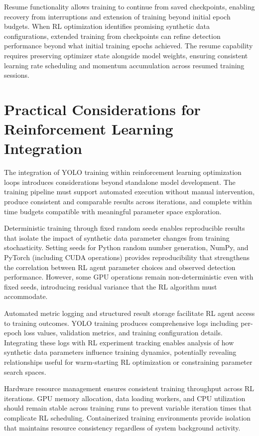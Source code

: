 Resume functionality allows training to continue from saved checkpoints, enabling recovery from interruptions and extension of training beyond initial epoch budgets. When RL optimization identifies promising synthetic data configurations, extended training from checkpoints can refine detection performance beyond what initial training epochs achieved. The resume capability requires preserving optimizer state alongside model weights, ensuring consistent learning rate scheduling and momentum accumulation across resumed training sessions.

\section{Practical Considerations for Reinforcement Learning Integration}

The integration of YOLO training within reinforcement learning optimization loops introduces considerations beyond standalone model development. The training pipeline must support automated execution without manual intervention, produce consistent and comparable results across iterations, and complete within time budgets compatible with meaningful parameter space exploration.

Deterministic training through fixed random seeds enables reproducible results that isolate the impact of synthetic data parameter changes from training stochasticity. Setting seeds for Python random number generation, NumPy, and PyTorch (including CUDA operations) provides reproducibility that strengthens the correlation between RL agent parameter choices and observed detection performance. However, some GPU operations remain non-deterministic even with fixed seeds, introducing residual variance that the RL algorithm must accommodate.

Automated metric logging and structured result storage facilitate RL agent access to training outcomes. YOLO training produces comprehensive logs including per-epoch loss values, validation metrics, and training configuration details. Integrating these logs with RL experiment tracking enables analysis of how synthetic data parameters influence training dynamics, potentially revealing relationships useful for warm-starting RL optimization or constraining parameter search spaces.

Hardware resource management ensures consistent training throughput across RL iterations. GPU memory allocation, data loading workers, and CPU utilization should remain stable across training runs to prevent variable iteration times that complicate RL scheduling. Containerized training environments provide isolation that maintains resource consistency regardless of system background activity.

